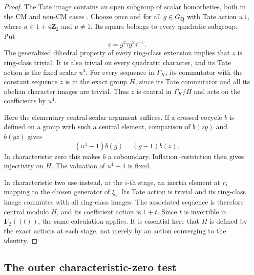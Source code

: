 \begin{proof}
The Tate image contains an open subgroup of scalar homotheties, both
in the CM and non-CM cases
\cite[\S2, Theorem~3 and paragraph~7]{Bogomolov1981Points}.  Choose once and for all
$g\in G_{\mathbf Q}$ with Tate action $u\,1$, where
$u\in1+4\mathbf Z_2$ and $u\ne1$.  Its square belongs to every
quadratic subgroup.  Put
\[
 z=g^2\tau g^2\tau^{-1}.
\]
The generalized dihedral property of every ring-class extension
implies that $z$ is ring-class trivial.  It is also trivial on every
quadratic character, and its Tate action is the fixed scalar $u^4$.
For every sequence in $\Gamma_K$, its commutator with the constant
sequence $z$ is in the exact group $H$, since its Tate commutator and
all its abelian character images are trivial.  Thus $z$ is central in
$\Gamma_K/H$ and acts on the coefficients by $u^4$.

Here the elementary central-scalar argument suffices.  If a crossed
cocycle $b$ is defined on a group with such a central element, comparison
of $b(zg)$ and $b(gz)$ gives
\[
 (u^4-1)b(g)=(g-1)b(z).
\]
In characteristic zero this makes $b$ a coboundary.  Inflation--restriction
then gives injectivity on $H$.  The valuation of $u^4-1$ is fixed.

In characteristic two use instead, at the $i$-th stage, an inertia
element at $r_i$ mapping to the chosen generator of $\xi_i$.  Its
Tate action is trivial and its ring-class image commutes with all
ring-class images.  The associated sequence is therefore central
modulo $H$, and its coefficient action is $1+t$.  Since $t$ is
invertible in $\mathbf F_2((t))$, the same calculation applies.
It is essential here that $H$ is defined by the exact actions at each
stage, not merely by an action converging to the identity.
\end{proof}

\subsection{The outer characteristic-zero test}

